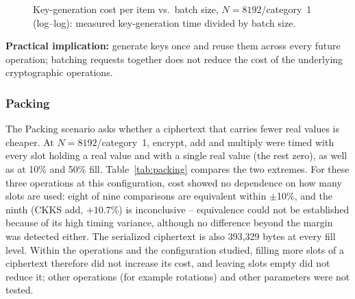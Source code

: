 \begin{figure}[h!]
\centering

\caption{Key-generation cost per item vs.\ batch size, $N{=}8192$/category~1 (log--log): measured key-generation time divided by batch size.}
\label{fig:batching}
\end{figure}

\textbf{Practical implication:} generate keys once and reuse them across every future operation; batching requests together does not reduce the cost of the underlying cryptographic operations.

\subsubsection*{Packing}

The Packing scenario asks whether a ciphertext that carries fewer real values is cheaper. At $N{=}8192$/category~1, encrypt, add and multiply were timed with every slot holding a real value and with a single real value (the rest zero), as well as at 10\% and 50\% fill. Table~\ref{tab:packing} compares the two extremes. For these three operations at this configuration, cost showed no dependence on how many slots are used: eight of nine comparisons are equivalent within $\pm$10\%, and the ninth (CKKS add, $+10.7\%$) is inconclusive -- equivalence could not be established because of its high timing variance, although no difference beyond the margin was detected either. The serialized ciphertext is also 393{,}329 bytes at every fill level. Within the operations and the configuration studied, filling more slots of a ciphertext therefore did not increase its cost, and leaving slots empty did not reduce it; other operations (for example rotations) and other parameters were not tested.

\begin{table}[h!]
\centering\small

\caption{Latency with all slots filled vs.\ a single real value, $N{=}8192$/category~1 (mean of 100 runs; from \texttt{seal\_packing\_equivalence.csv}).}
\label{tab:packing}
\end{table}

